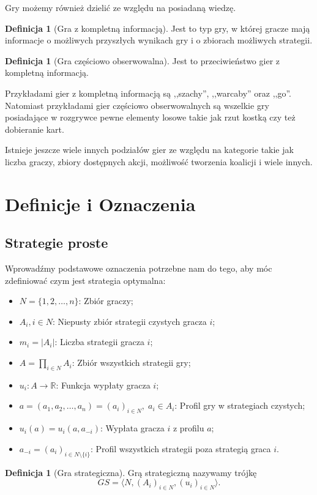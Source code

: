 \documentclass[inzynierska]{pwr_wmat_praca_dyplomowa}
\theoremstyle{plain}
\numberwithin{theorem}{chapter}
\theoremstyle{definition}
\numberwithin{theorem}{chapter}
\newtheorem{definition}[theorem]{Definicja}
\begin{document}
Gry możemy również dzielić ze względu na posiadaną wiedzę.
\begin{definition}[Gra z kompletną informacją]
	Jest to typ gry, w której gracze mają informacje o możliwych przyszłych wynikach gry i o zbiorach możliwych strategii.
\end{definition}
\begin{definition}[Gra częściowo obserwowalna]
	Jest to przeciwieństwo gier z kompletną informacją.
\end{definition}
\noindent
Przykładami gier z kompletną informacją są ,,szachy'', ,,warcaby'' oraz ,,go''.
Natomiast przykładami gier częściowo obserwowalnych są wszelkie gry posiadające w rozgrywce pewne elementy losowe takie jak rzut kostką czy też dobieranie kart. 

Istnieje jeszcze wiele innych podziałów gier ze względu na kategorie takie jak liczba graczy, zbiory dostępnych akcji, możliwość tworzenia koalicji i wiele innych.
\section{Definicje i Oznaczenia}
\subsection{Strategie proste}
Wprowadźmy podstawowe oznaczenia potrzebne nam do tego, aby móc zdefiniować czym jest strategia optymalna:
\begin{itemize}
	\item $ N = \{1, 2, \dots, n\} $: Zbiór graczy;
	\item $A_i, i \in N $: Niepusty zbiór strategii  czystych gracza $i$;
	\item $m_i = |A_i|$: Liczba strategii gracza $i$;
	\item $A = \prod_{i \in N} A_i$: Zbiór wszystkich strategii gry;
	\item $u_i : A \rightarrow \mathbb{R} $: Funkcja wypłaty gracza $i$;
	\item $a=(a_1, a_2, \dots, a_n)=(a_i)_{i \in N},\; a_i \in A_i$: Profil gry w strategiach czystych;
	\item $u_i(a) = u_i(a, a_{-i})$: Wypłata gracza $i$ z profilu $a$;
	\item $a_{-i} = (a_i)_{i\in N \setminus \{i\}}$: Profil wszystkich strategii poza strategią graca $i$.
\end{itemize}
	\begin{definition}[Gra strategiczna]
		Grą strategiczną nazywamy trójkę 
		\begin{equation*}
					GS = \langle N,  (A_i)_{i \in N}, (u_i)_{i \in N} \rangle.
		\end{equation*}
	\end{definition}
	
\end{document}
